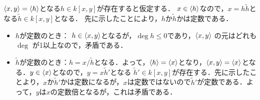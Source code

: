 \documentclass[9pt]{ltjsarticle}
\theoremstyle{break}
\theoremstyle{break}
\theoremstyle{break}
\theoremstyle{break}
\theoremstyle{break}
\theoremstyle{break}
\theoremstyle{break}
\theoremstyle{break}
\theoremstyle{break}
\theoremstyle{break}
\theoremstyle{break}
\theoremstyle{break}
\theoremstyle{break}
\theoremstyle{break}
\theoremstyle{break}
\theoremstyle{nonumberbreak}
\theoremstyle{nonumberbreak}
\begin{document}
\begin{enumerate}[label=(問題\arabic*)]
$\langle x,y \rangle=\langle h \rangle$となる$h\in k[x,y]$が存在すると仮定する．
$x\in \langle h \rangle$なので，$x=h\tilde h$となる$\tilde h\in k[x,y]$となる．
先に示したことにより，$h$か$\tilde h$かは定数である．
\begin{itemize}
 \item $h$が定数のとき：
$h\in \langle x,y \rangle$となるが，$\deg h \le 0$であり，$\langle x,y \rangle$
の元はどれも$\deg$       が1以上なので，矛盾である．
 \item $\tilde h$が定数のとき：$h=x/\tilde h$となる．よって，$\langle h \rangle=\langle x \rangle$となり，$\langle x,y \rangle=\langle x \rangle$となる．$y\in \langle x \rangle$となので，$y=x\tilde h'$となる
$\tilde h' \in k[x,y]$が存在する．先に示したことより，$x$か$\tilde h'$かは定数になるが，$x$は定数ではないので$\tilde h'$が定数である．よって，$y$は$x$の定数倍となるが，これは矛盾である．
\end{itemize}


\end{enumerate}
\end{document}
